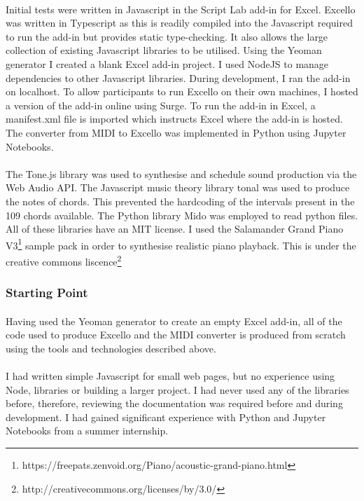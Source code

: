 \paragraph{} Initial tests were written in Javascript in the Script Lab add-in for Excel. Excello was written in Typescript as this is readily compiled into the Javascript required to run the add-in but provides static type-checking. It also allows the large collection of existing Javascript libraries to be utilised. Using the Yeoman generator I created a blank Excel add-in project. I used NodeJS to manage dependencies to other Javascript libraries. During development, I ran the add-in on localhost. To allow participants to run Excello on their own machines, I hosted a version of the add-in online using Surge. To run the add-in in Excel, a manifest.xml file is imported which instructs Excel where the add-in is hosted. The converter from MIDI to Excello was implemented in Python using Jupyter Notebooks.

\paragraph{} The Tone.js library was used to synthesise and schedule sound production via the Web Audio API. The Javascript music theory library tonal was used to produce the notes of chords. This prevented the hardcoding of the intervals present in the 109 chords available. The Python library Mido was employed to read python files. All of these libraries have an MIT license. I used the Salamander Grand Piano V3\footnote{https://freepats.zenvoid.org/Piano/acoustic-grand-piano.html} sample pack in order to synthesise realistic piano playback. This is under the creative commons liscence\footnote{http://creativecommons.org/licenses/by/3.0/}

\subsubsection{Starting Point}

\paragraph{} Having used the Yeoman generator to create an empty Excel add-in, all of the code used to produce Excello and the MIDI converter is produced from scratch using the tools and technologies described above.

\paragraph{} I had written simple Javascript for small web pages, but no experience using Node, libraries or building a larger project. I had never used any of the libraries before, therefore, reviewing the documentation was required before and during development. I had gained significant experience with Python and Jupyter Notebooks from a summer internship.

